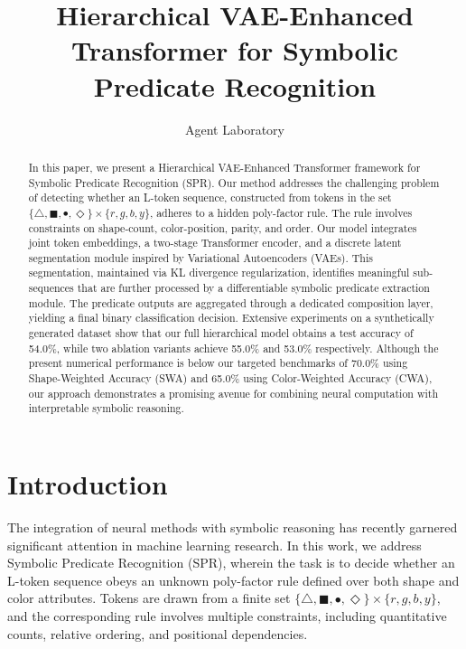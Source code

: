 \documentclass{article}
\title{Hierarchical VAE-Enhanced Transformer for Symbolic Predicate Recognition}
\author{Agent Laboratory}
\date{}
\begin{document}
\maketitle

\begin{abstract}
In this paper, we present a Hierarchical VAE-Enhanced Transformer framework for Symbolic Predicate Recognition (SPR). Our method addresses the challenging problem of detecting whether an L-token sequence, constructed from tokens in the set $\{\triangle, \blacksquare, \bullet, \Diamond\} \times \{r, g, b, y\}$, adheres to a hidden poly-factor rule. The rule involves constraints on shape-count, color-position, parity, and order. Our model integrates joint token embeddings, a two-stage Transformer encoder, and a discrete latent segmentation module inspired by Variational Autoencoders (VAEs). This segmentation, maintained via KL divergence regularization, identifies meaningful sub-sequences that are further processed by a differentiable symbolic predicate extraction module. The predicate outputs are aggregated through a dedicated composition layer, yielding a final binary classification decision. Extensive experiments on a synthetically generated dataset show that our full hierarchical model obtains a test accuracy of 54.0\%, while two ablation variants achieve 55.0\% and 53.0\% respectively. Although the present numerical performance is below our targeted benchmarks of 70.0\% using Shape-Weighted Accuracy (SWA) and 65.0\% using Color-Weighted Accuracy (CWA), our approach demonstrates a promising avenue for combining neural computation with interpretable symbolic reasoning.
\end{abstract}

\section{Introduction}
The integration of neural methods with symbolic reasoning has recently garnered significant attention in machine learning research. In this work, we address Symbolic Predicate Recognition (SPR), wherein the task is to decide whether an L-token sequence obeys an unknown poly-factor rule defined over both shape and color attributes. Tokens are drawn from a finite set $\{\triangle, \blacksquare, \bullet, \Diamond\} \times \{r, g, b, y\}$, and the corresponding rule involves multiple constraints, including quantitative counts, relative ordering, and positional dependencies.
\end{document}
